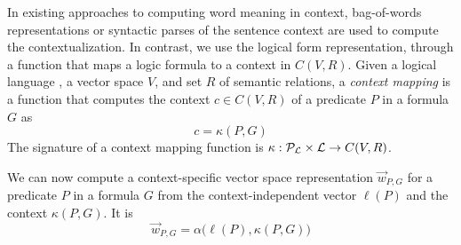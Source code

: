 

In existing approaches to computing word meaning in context, bag-of-words
representations or syntactic parses of the sentence context are used to compute
the contextualization. In contrast, we use the logical form representation,
through a function that maps a logic formula to a context in $C(V, R)$.  Given a
logical language \loglang, a vector space $V$, and set $R$ of semantic
relations, a \textit{context mapping} is a function that computes the context $c
\in C(V, R)$ of a predicate $P$ in a formula $G$ as \[c = \kappa(P, G)\] The
signature of a context mapping function is $\kappa:
{\cal{P}}_{{\cal{L}}} \times {\cal{L}} \to C(V, R)$.

We can now compute a context-specific vector space representation $\vec{w}_{P,
G}$ for a predicate $P$ in a formula $G$ from the context-independent vector
$\ell(P)$ and the context $\kappa(P, G)$. It is \[\vec{w}_{P, G} =
\alpha\big(\ell(P), \kappa(P, G)\big)\]

